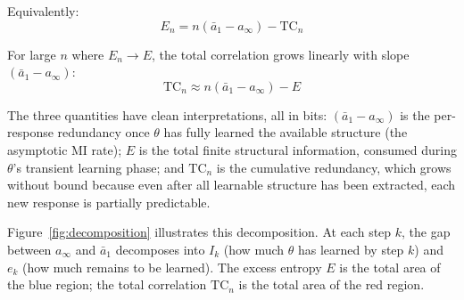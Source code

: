 \documentclass[11pt]{article}
\newcommand{\TC}{\mathrm{TC}}
\begin{document}
Equivalently:
\begin{equation}\label{eq:tc-decomp}
    E_n = n(\bar{a}_1 - a_\infty) - \TC_n
\end{equation}

For large $n$ where $E_n \to E$, the total correlation grows linearly with slope $(\bar{a}_1 - a_\infty)$:
\begin{equation}
    \TC_n \approx n(\bar{a}_1 - a_\infty) - E
\end{equation}

The three quantities have clean interpretations, all in bits: $(\bar{a}_1 - a_\infty)$ is the per-response redundancy once $\theta$ has fully learned the available structure (the asymptotic MI rate); $E$ is the total finite structural information, consumed during $\theta$'s transient learning phase; and $\TC_n$ is the cumulative redundancy, which grows without bound because even after all learnable structure has been extracted, each new response is partially predictable.

Figure~\ref{fig:decomposition} illustrates this decomposition. At each step $k$, the gap between $a_\infty$ and $\bar{a}_1$ decomposes into $I_k$ (how much $\theta$ has learned by step $k$) and $e_k$ (how much remains to be learned). The excess entropy $E$ is the total area of the blue region; the total correlation $\TC_n$ is the total area of the red region.
\end{document}
